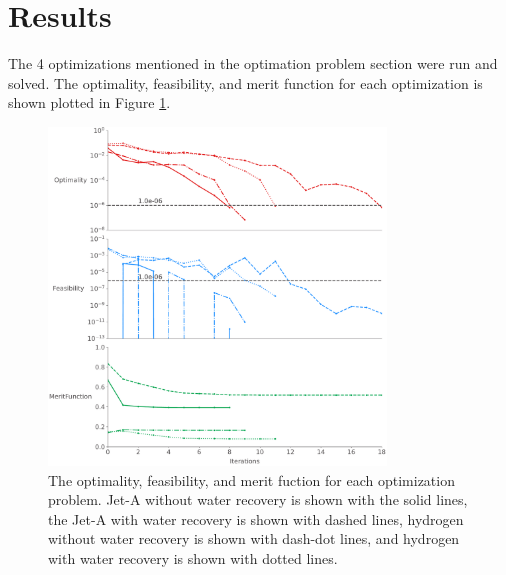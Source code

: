 \documentclass[conf]{new-aiaa}
\begin{document}

\section{Results}
\label{sec:results}
The 4 optimizations mentioned in the optimation problem section were run and solved.
The optimality, feasibility, and merit function for each optimization is shown plotted in Figure \ref{fig:history_clvr}.


\begin{figure}[hbt!]
    \centering
    \includegraphics[width=0.8\textwidth]{opt_summary.pdf}
    \caption{The optimality, feasibility, and merit fuction for each optimization problem.
        Jet-A without water recovery is shown with the solid lines, the Jet-A with water recovery is shown with dashed lines, hydrogen without water recovery is shown with dash-dot lines, and hydrogen with water recovery is shown with dotted lines.}
    \label{fig:history_clvr}
\end{figure}
\end{document}

